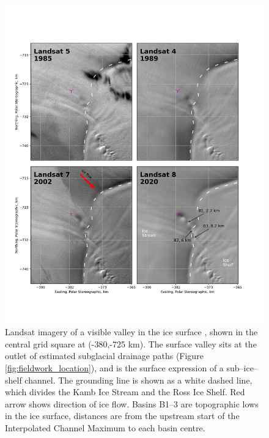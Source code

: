 \begin{figure}[!ht]
\centering
\includegraphics[width=1\textwidth]{chapters/2/historic_channel.png}
\caption[Historic Landsat imagery]{Landsat imagery of a visible valley in the ice surface \citep{RoyLandsat8Scienceproduct2014}, shown in the central grid square at (-380,-725 km). The surface valley sits at the outlet of estimated subglacial drainage paths (Figure \ref{fig:fieldwork_location}), and is the surface expression of a sub--ice--shelf channel. The grounding line \citep{depoorter2013calving} is shown as a white dashed line, which divides the Kamb Ice Stream and the Ross Ice Shelf. Red arrow shows direction of ice flow. Basins B1--3 are topographic lows in the ice surface, distances are  from the upstream start of the Interpolated Channel Maximum to each basin centre.}
\label{fig:historic}
\end{figure}




